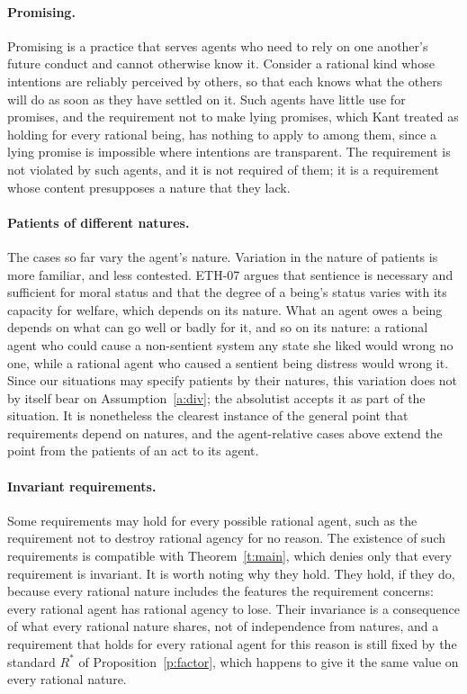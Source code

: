 \documentclass{situationist-preprint}
\begin{document}
\paragraph{Promising.} Promising is a practice that serves agents who need to rely on one another's future conduct and cannot otherwise know it. Consider a rational kind whose intentions are reliably perceived by others, so that each knows what the others will do as soon as they have settled on it. Such agents have little use for promises, and the requirement not to make lying promises, which Kant treated as holding for every rational being, has nothing to apply to among them, since a lying promise is impossible where intentions are transparent. The requirement is not violated by such agents, and it is not required of them; it is a requirement whose content presupposes a nature that they lack.

\paragraph{Patients of different natures.} The cases so far vary the agent's nature. Variation in the nature of patients is more familiar, and less contested. ETH-07 argues that sentience is necessary and sufficient for moral status and that the degree of a being's status varies with its capacity for welfare, which depends on its nature. What an agent owes a being depends on what can go well or badly for it, and so on its nature: a rational agent who could cause a non-sentient system any state she liked would wrong no one, while a rational agent who caused a sentient being distress would wrong it. Since our situations may specify patients by their natures, this variation does not by itself bear on Assumption~\ref{a:div}; the absolutist accepts it as part of the situation. It is nonetheless the clearest instance of the general point that requirements depend on natures, and the agent-relative cases above extend the point from the patients of an act to its agent.

\paragraph{Invariant requirements.} Some requirements may hold for every possible rational agent, such as the requirement not to destroy rational agency for no reason. The existence of such requirements is compatible with Theorem~\ref{t:main}, which denies only that every requirement is invariant. It is worth noting why they hold. They hold, if they do, because every rational nature includes the features the requirement concerns: every rational agent has rational agency to lose. Their invariance is a consequence of what every rational nature shares, not of independence from natures, and a requirement that holds for every rational agent for this reason is still fixed by the standard $R^*$ of Proposition~\ref{p:factor}, which happens to give it the same value on every rational nature.
\end{document}
